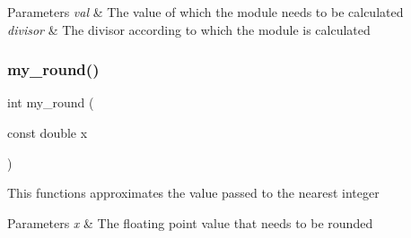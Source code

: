 \begin{DoxyParams}{Parameters}
{\em val} & The value of which the module needs to be calculated \\
\hline
{\em divisor} & The divisor according to which the module is calculated \\
\hline
\end{DoxyParams}
\mbox{\label{utils_8h_a1ea4108a2c530470624ce2678e65dcef}} 
\subsubsection{my\+\_\+round()}
{\footnotesize\ttfamily int my\+\_\+round (\begin{DoxyParamCaption}\item[{const double}]{x }\end{DoxyParamCaption})}

This functions approximates the value passed to the nearest integer


\begin{DoxyParams}{Parameters}
{\em x} & The floating point value that needs to be rounded \\
\hline
\end{DoxyParams}
